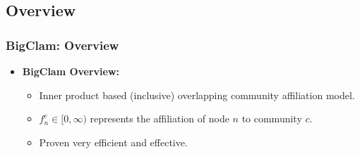 \documentclass{beamer}
\begin{document}
\subsection{Overview}
\begin{frame}
\frametitle{BigClam: Overview}
\begin{itemize}[itemsep=0.7em, label=\textbullet]
    \item \textbf{BigClam Overview:}%
    \begin{itemize}[itemsep=1em, label=\textbullet]
        \item Inner product based (inclusive) overlapping community affiliation model.
        \item $f_n^c \in [0,\infty)$ represents the affiliation of node $n$ to community $c$.
        \item Proven very efficient and effective.%
    \end{itemize}
    
\end{itemize}

\end{frame}
\end{document}
